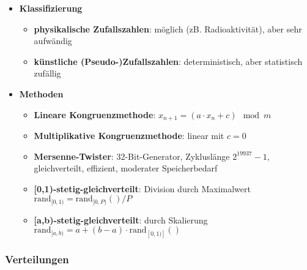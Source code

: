 \documentclass{article}
\begin{document}
\begin{itemize}
  \item \textbf{Klassifizierung}
        \begin{itemize}
          \item \textbf{physikalische Zufallszahlen}: möglich (zB. Radioaktivität), aber sehr aufwändig
          \item \textbf{künstliche (Pseudo-)Zufallszahlen}: deterministisch, aber statistisch zufällig
        \end{itemize}
  \item \textbf{Methoden}
        \begin{itemize}
          \item \textbf{Lineare Kongruenzmethode}: $x_{n+1} = (a \cdot x_n + c) \mod m$
          \item \textbf{Multiplikative Kongruenzmethode}: linear mit $c=0$
          \item \textbf{Mersenne-Twister}: 32-Bit-Generator, Zykluslänge $2^{19937}-1$, gleichverteilt, effizient, moderater Speicherbedarf
          \item  \textbf{[0,1)-stetig-gleichverteilt}: Division durch Maximalwert $\text{rand}_{[0,1)} = \text{rand}_{[0,P)}()/P$
          \item \textbf{[a,b)-stetig-gleichverteilt}: durch Skalierung $\text{rand}_ {[a,b)} = a + (b-a) \cdot \text{rand}_{[0,1)]}()$
        \end{itemize}
\end{itemize}

\subsubsection{Verteilungen}
\end{document}

